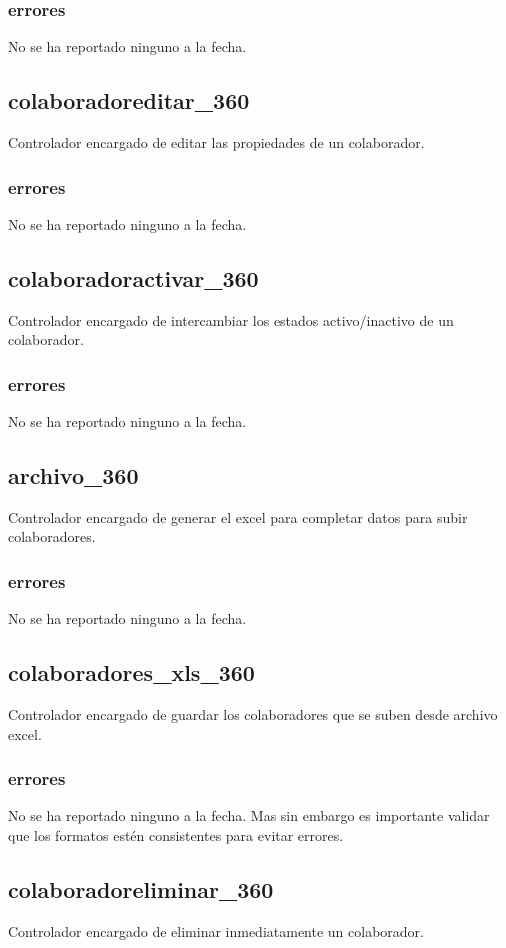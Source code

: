 \documentclass[10pt,a4paper]{book}
\begin{document}
	\subsubsection{errores}
	No se ha reportado ninguno a la fecha.

	\subsection{colaboradoreditar\_360}
	Controlador encargado de editar las propiedades de un colaborador.
	\subsubsection{errores}
	No se ha reportado ninguno a la fecha.

	\subsection{colaboradoractivar\_360}
	Controlador encargado de intercambiar los estados activo/inactivo de un colaborador.
	\subsubsection{errores}
	No se ha reportado ninguno a la fecha.

	\subsection{archivo\_360}
	Controlador encargado de generar el excel para completar datos para subir colaboradores.
	\subsubsection{errores}
	No se ha reportado ninguno a la fecha.

	\subsection{colaboradores\_xls\_360}
	Controlador encargado de guardar los colaboradores que se suben desde archivo excel.
	\subsubsection{errores}
	No se ha reportado ninguno a la fecha. Mas sin embargo es importante validar que los formatos estén consistentes para evitar errores.

	\subsection{colaboradoreliminar\_360}
	Controlador encargado de eliminar inmediatamente un colaborador.
\end{document}
